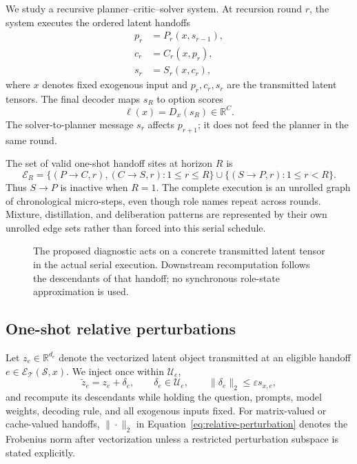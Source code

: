 \documentclass[11pt]{article}
\newcommand{\R}{\mathbb R}
\newcommand{\eps}{\varepsilon}
\newcommand{\sys}{\mathcal S}
\newcommand{\threat}{\mathcal T}
\begin{document}
We study a recursive planner--critic--solver system. At recursion round $r$,
the system executes the ordered latent handoffs
\begin{align}
    p_r &= P_r(x,s_{r-1}), \\
    c_r &= C_r(x,p_r), \\
    s_r &= S_r(x,c_r),
    \label{eq:serial-system}
\end{align}
where $x$ denotes fixed exogenous input and $p_r,c_r,s_r$ are the transmitted
latent tensors. The final decoder maps $s_R$ to option scores
\begin{equation}
    \ell(x)=D_x(s_R)\in\R^C.
\end{equation}
The solver-to-planner message $s_r$ affects $p_{r+1}$; it does not feed the
planner in the same round.

The set of valid one-shot handoff sites at horizon $R$ is
\begin{equation}
\mathcal E_R=
\{(P{\to}C,r),(C{\to}S,r):1\le r\le R\}
\cup
\{(S{\to}P,r):1\le r<R\}.
\label{eq:edge-set}
\end{equation}
Thus $S{\to}P$ is inactive when $R=1$. The complete execution is an unrolled
graph of chronological micro-steps, even though role names repeat across
rounds. Mixture,
distillation, and deliberation patterns are represented by their own unrolled
edge sets rather than forced into this serial schedule.

\begin{figure}[t]
\centering
{}
\caption{The proposed diagnostic acts on a concrete transmitted latent tensor
in the actual serial execution. Downstream recomputation follows the descendants
of that handoff; no synchronous role-state approximation is used.}
\label{fig:unrolled-overview}
\end{figure}

\subsection{One-shot relative perturbations}

Let $z_e\in\R^{d_e}$ denote the vectorized latent object transmitted at an
eligible handoff $e\in\mathcal E_{\threat}(\sys,x)$. We inject once within
\(\mathcal U_e\),
\begin{equation}
    \widetilde z_e=z_e+\delta_e,
    \qquad
    \delta_e\in\mathcal U_e,
    \qquad
    \|\delta_e\|_2\le\eps s_{x,e},
    \label{eq:relative-perturbation}
\end{equation}
and recompute its descendants while holding the question, prompts, model
weights, decoding rule, and all exogenous inputs fixed. For matrix-valued or
cache-valued handoffs, $\|\cdot\|_2$ in Equation~\eqref{eq:relative-perturbation}
denotes the Frobenius norm after vectorization unless a restricted perturbation
subspace is stated explicitly.
\end{document}
